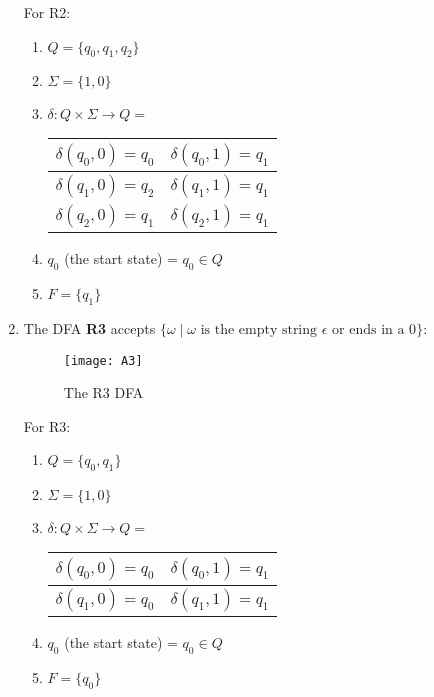 \documentclass[11pt,a4paper]{article}
\begin{document}
\begin{enumerate}
                For R2:
                \begin{enumerate}
                    \item $Q = \{q_0, q_1, q_2\}$
                    \item $\Sigma = \{1, 0\}$
                    \item $\delta \colon Q \times \Sigma \rightarrow Q =$
                    \begin{tabular}{|c|c|} 
                        \hline
                        $\delta(q_0, 0) = q_0$ & $\delta(q_0, 1) = q_1$\\
                        \hline
                        $\delta(q_1, 0) = q_2$ & $\delta(q_1, 1) = q_1$ \\
                        \hline
                        $\delta(q_2, 0) = q_1$ & $\delta(q_2, 1) = q_1$ \\
                        \hline
                   \end{tabular}
                    \item $q_0$ (the start state) = $q_0 \in Q$
                    \item $F = \{q_1\}$
                \end{enumerate}

            \item The DFA \textbf{R3} accepts $\{\omega\mid\omega\text{ is the empty string $\epsilon$ or ends in a 0}\}$:

                \begin{figure}[H]
                    \centering
                    \texttt{[image: A3]}
                    \caption{The R3 DFA}
                \end{figure}

                For R3:
                \begin{enumerate}
                    \item $Q = \{q_0, q_1\}$
                    \item $\Sigma = \{1, 0\}$
                    \item $\delta \colon Q \times \Sigma \rightarrow Q =$
                    \begin{tabular}{|c|c|} 
                        \hline
                        $\delta(q_0, 0) = q_0$ & $\delta(q_0, 1) = q_1$\\
                        \hline
                        $\delta(q_1, 0) = q_0$ & $\delta(q_1, 1) = q_1$ \\
                        \hline
                   \end{tabular}
                    \item $q_0$ (the start state) = $q_0 \in Q$
                    \item $F = \{q_0\}$
                \end{enumerate}


\end{enumerate}
\end{document}
